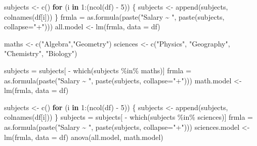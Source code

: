 \documentclass[
]{article}
\newenvironment{Shaded}{\begin{snugshade}}{\end{snugshade}}
\newcommand{\AttributeTok}[1]{\textcolor[rgb]{0.77,0.63,0.00}{#1}}
\newcommand{\ControlFlowTok}[1]{\textcolor[rgb]{0.13,0.29,0.53}{\textbf{#1}}}
\newcommand{\DecValTok}[1]{\textcolor[rgb]{0.00,0.00,0.81}{#1}}
\newcommand{\FunctionTok}[1]{\textcolor[rgb]{0.00,0.00,0.00}{#1}}
\newcommand{\NormalTok}[1]{#1}
\newcommand{\OtherTok}[1]{\textcolor[rgb]{0.56,0.35,0.01}{#1}}
\newcommand{\SpecialCharTok}[1]{\textcolor[rgb]{0.00,0.00,0.00}{#1}}
\newcommand{\StringTok}[1]{\textcolor[rgb]{0.31,0.60,0.02}{#1}}
\begin{document}
\begin{Shaded}
\begin{Highlighting}[]
\NormalTok{subjects }\OtherTok{\textless{}{-}} \FunctionTok{c}\NormalTok{()  }
\ControlFlowTok{for}\NormalTok{ (i }\ControlFlowTok{in} \DecValTok{1}\SpecialCharTok{:}\NormalTok{(}\FunctionTok{ncol}\NormalTok{(df) }\SpecialCharTok{{-}} \DecValTok{5}\NormalTok{)) \{}
\NormalTok{  subjects }\OtherTok{\textless{}{-}} \FunctionTok{append}\NormalTok{(subjects, }\FunctionTok{colnames}\NormalTok{(df[i]))  }
\NormalTok{\}}
\NormalTok{frmla }\OtherTok{=} \FunctionTok{as.formula}\NormalTok{(}\FunctionTok{paste}\NormalTok{(}\StringTok{"Salary \textasciitilde{} "}\NormalTok{, }\FunctionTok{paste}\NormalTok{(subjects, }\AttributeTok{collapse=}\StringTok{"+"}\NormalTok{)))}
\NormalTok{all.model }\OtherTok{\textless{}{-}} \FunctionTok{lm}\NormalTok{(frmla, }\AttributeTok{data =}\NormalTok{ df)}

\NormalTok{maths }\OtherTok{\textless{}{-}} \FunctionTok{c}\NormalTok{(}\StringTok{"Algebra"}\NormalTok{,}\StringTok{"Geometry"}\NormalTok{)}
\NormalTok{sciences }\OtherTok{\textless{}{-}} \FunctionTok{c}\NormalTok{(}\StringTok{"Physics"}\NormalTok{, }\StringTok{"Geography"}\NormalTok{, }\StringTok{"Chemistry"}\NormalTok{, }\StringTok{"Biology"}\NormalTok{)}

\NormalTok{subjects }\OtherTok{=}\NormalTok{ subjects[ }\SpecialCharTok{{-}} \FunctionTok{which}\NormalTok{(subjects }\SpecialCharTok{\%in\%}\NormalTok{ maths)]}
\NormalTok{frmla }\OtherTok{=} \FunctionTok{as.formula}\NormalTok{(}\FunctionTok{paste}\NormalTok{(}\StringTok{"Salary \textasciitilde{} "}\NormalTok{, }\FunctionTok{paste}\NormalTok{(subjects, }\AttributeTok{collapse=}\StringTok{"+"}\NormalTok{)))}
\NormalTok{math.model }\OtherTok{\textless{}{-}} \FunctionTok{lm}\NormalTok{(frmla, }\AttributeTok{data =}\NormalTok{ df)}

\NormalTok{subjects }\OtherTok{\textless{}{-}} \FunctionTok{c}\NormalTok{()  }
\ControlFlowTok{for}\NormalTok{ (i }\ControlFlowTok{in} \DecValTok{1}\SpecialCharTok{:}\NormalTok{(}\FunctionTok{ncol}\NormalTok{(df) }\SpecialCharTok{{-}} \DecValTok{5}\NormalTok{)) \{}
\NormalTok{  subjects }\OtherTok{\textless{}{-}} \FunctionTok{append}\NormalTok{(subjects, }\FunctionTok{colnames}\NormalTok{(df[i]))  }
\NormalTok{\}}
\NormalTok{subjects }\OtherTok{=}\NormalTok{ subjects[ }\SpecialCharTok{{-}} \FunctionTok{which}\NormalTok{(subjects }\SpecialCharTok{\%in\%}\NormalTok{ sciences)]}
\NormalTok{frmla }\OtherTok{=} \FunctionTok{as.formula}\NormalTok{(}\FunctionTok{paste}\NormalTok{(}\StringTok{"Salary \textasciitilde{} "}\NormalTok{, }\FunctionTok{paste}\NormalTok{(subjects, }\AttributeTok{collapse=}\StringTok{"+"}\NormalTok{)))}
\NormalTok{sciences.model }\OtherTok{\textless{}{-}} \FunctionTok{lm}\NormalTok{(frmla, }\AttributeTok{data =}\NormalTok{ df)}
\FunctionTok{anova}\NormalTok{(all.model, math.model)}
\end{Highlighting}
\end{Shaded}
\end{document}
